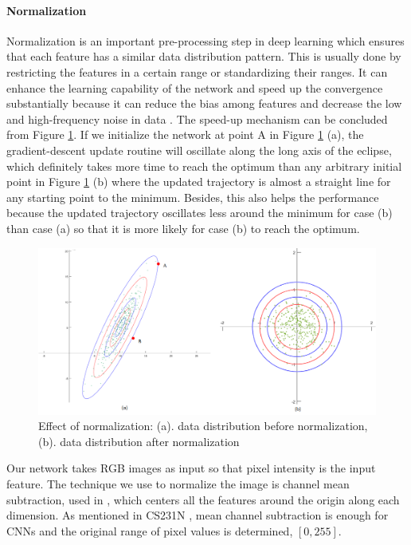 \documentclass[a4paper,12pt]{article}
\begin{document}
\paragraph{Normalization}
\label{normalization}
Normalization is an important pre-processing step in deep learning which ensures that each feature has a similar data distribution pattern. This is usually done by restricting the features in a certain range or standardizing their ranges. It can enhance the learning capability of the network and speed up the convergence substantially  because it can reduce the bias among features and decrease the low and high-frequency noise in data \cite{Jayalakshmi2011}. The speed-up mechanism can be concluded from Figure \ref{figure:contour}. If we initialize the network at point A in Figure \ref{figure:contour} (a), the gradient-descent update routine will oscillate along the long axis of the eclipse, which definitely takes more time to reach the optimum than any arbitrary initial point in Figure \ref{figure:contour} (b) where the updated trajectory is almost a straight line for any starting point  to the minimum. Besides, this also helps the performance because the updated trajectory oscillates less around the minimum for case (b) than case (a) so that it is more likely for case (b) to reach the optimum.

\begin{figure}[h]		
	\includegraphics[width=1\textwidth]{contour.png}
	\caption[Effect of nomalization.]{Effect of normalization: (a). data distribution before normalization, (b). data distribution after normalization}
	\centering
	\label{figure:contour}
\end{figure}

Our network takes RGB images as input so that pixel intensity is the input feature. The technique we use to normalize the image is channel mean subtraction, used in \cite{DBLP:journals/corr/SimonyanZ14a, DBLP:journals/corr/GirshickDDM13}, which centers all the features around the origin along each dimension. As mentioned in CS231N \cite{CS231N}, mean channel subtraction is enough for CNNs and the original range of pixel values is determined, \ie $[0, 255]$.
\end{document}
